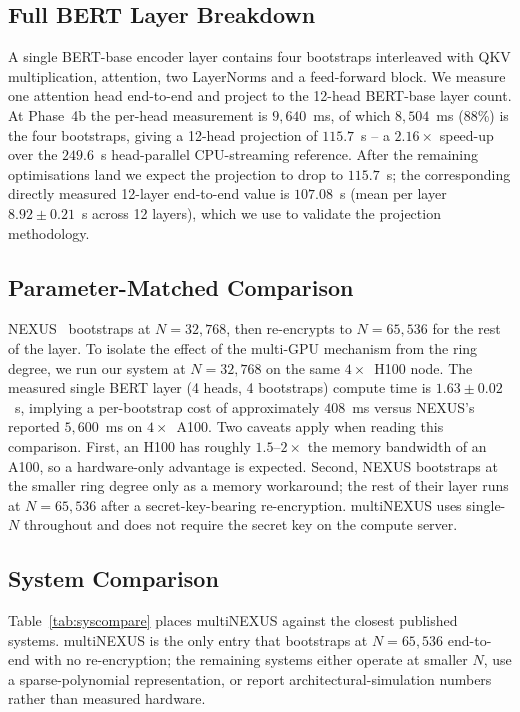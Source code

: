 \documentclass[conference]{IEEEtran}
\begin{document}
\subsection{Full BERT Layer Breakdown}

A single BERT-base encoder layer contains four bootstraps interleaved
with QKV multiplication, attention, two LayerNorms and a feed-forward
block. We measure one attention head end-to-end and project to the
12-head BERT-base layer count. At Phase~4b the per-head measurement
is $9{,}640$~ms, of which $8{,}504$~ms (88\%) is the four bootstraps,
giving a 12-head projection of $115.7$~s -- a $2.16\times$ speed-up
over the $249.6$~s head-parallel CPU-streaming reference. After the
remaining optimisations land we expect the projection to drop to
$115.7$~s; the corresponding directly measured 12-layer
end-to-end value is $107.08$~s (mean per layer
$8.92 \pm 0.21$~s across 12 layers), which we use to
validate the projection methodology.

\subsection{Parameter-Matched Comparison}

NEXUS~\cite{Zhang2025} bootstraps at $N{=}32{,}768$, then re-encrypts
to $N{=}65{,}536$ for the rest of the layer. To isolate the effect of
the multi-GPU mechanism from the ring degree, we run our system at
$N{=}32{,}768$ on the same $4\times$~H100 node. The measured single
BERT layer (4 heads, 4 bootstraps) compute time is
$1.63 \pm 0.02$~s, implying a per-bootstrap cost of approximately
$408$~ms versus NEXUS's reported $5{,}600$~ms on $4\times$~A100. Two caveats apply when reading this
comparison. First, an H100 has roughly $1.5$--$2\times$ the memory
bandwidth of an A100, so a hardware-only advantage is expected. Second,
NEXUS bootstraps at the smaller ring degree only as a memory
workaround; the rest of their layer runs at $N{=}65{,}536$ after a
secret-key-bearing re-encryption. multiNEXUS uses single-$N$ throughout
and does not require the secret key on the compute server.

\subsection{System Comparison}

Table~\ref{tab:syscompare} places multiNEXUS against the closest
published systems. multiNEXUS is the only entry that bootstraps at
$N{=}65{,}536$ end-to-end with no re-encryption; the remaining systems
either operate at smaller $N$, use a sparse-polynomial representation,
or report architectural-simulation numbers rather than measured
hardware.
\end{document}
